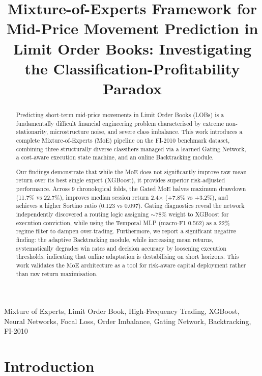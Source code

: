 \documentclass[conference]{IEEEtran}
\title{Mixture-of-Experts Framework for Mid-Price Movement Prediction in Limit Order Books: Investigating the Classification-Profitability Paradox}
\author{
\IEEEauthorblockN{Meet Chordia, Divaksh Jain}
\IEEEauthorblockA{Indian Institute of Technology Jodhpur}
}
\begin{document}
\maketitle

\begin{abstract}
Predicting short-term mid-price movements in Limit Order Books (LOBs) is
a fundamentally difficult financial engineering problem characterised by
extreme non-stationarity, microstructure noise, and severe class imbalance.
This work introduces a complete Mixture-of-Experts (MoE) pipeline on the
FI-2010 benchmark dataset, combining three structurally diverse classifiers
managed via a learned Gating Network, a cost-aware execution state machine,
and an online Backtracking module. 

Our findings demonstrate that while the MoE does not significantly improve
raw mean return over its best single expert (XGBoost), it provides superior
risk-adjusted performance. Across 9 chronological folds, the Gated MoE
halves maximum drawdown (11.7\% vs 22.7\%), improves median session return
2.4$\times$ (+7.8\% vs +3.2\%), and achieves a higher Sortino ratio
(0.123 vs 0.097). Gating diagnostics reveal the network independently
discovered a routing logic assigning $\sim$78\% weight to XGBoost for
execution conviction, while using the Temporal MLP (macro-F1 0.562) as a
22\% regime filter to dampen over-trading. Furthermore, we report a
significant negative finding: the adaptive Backtracking module, while
increasing mean returns, systematically degrades win rates and decision
accuracy by loosening execution thresholds, indicating that online
adaptation is destabilising on short horizons. This work validates the
MoE architecture as a tool for risk-aware capital deployment rather than
raw return maximisation.
\end{abstract}

\begin{IEEEkeywords}
Mixture of Experts, Limit Order Book, High-Frequency Trading, XGBoost,
Neural Networks, Focal Loss, Order Imbalance, Gating Network,
Backtracking, FI-2010
\end{IEEEkeywords}

\section{Introduction}
\end{document}
